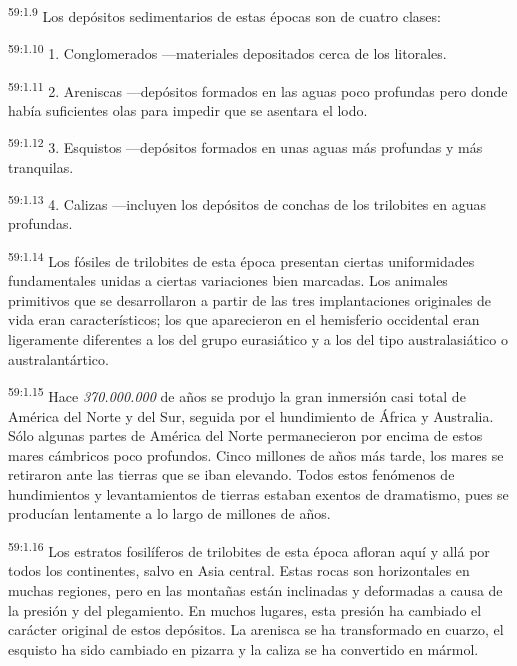 \par
\textsuperscript{59:1.9} Los depósitos sedimentarios de estas épocas son de cuatro clases:

\par
\textsuperscript{59:1.10} 1. Conglomerados ---materiales depositados cerca de los litorales.

\par
\textsuperscript{59:1.11} 2. Areniscas ---depósitos formados en las aguas poco profundas pero donde había suficientes olas para impedir que se asentara el lodo.

\par
\textsuperscript{59:1.12} 3. Esquistos ---depósitos formados en unas aguas más profundas y más tranquilas.

\par
\textsuperscript{59:1.13} 4. Calizas ---incluyen los depósitos de conchas de los trilobites en aguas profundas.

\par
\textsuperscript{59:1.14} Los fósiles de trilobites de esta época presentan ciertas uniformidades fundamentales unidas a ciertas variaciones bien marcadas. Los animales primitivos que se desarrollaron a partir de las tres implantaciones originales de vida eran característicos; los que aparecieron en el hemisferio occidental eran ligeramente diferentes a los del grupo eurasiático y a los del tipo australasiático o australantártico.

\par
\textsuperscript{59:1.15} Hace \textit{370.000.000} de años se produjo la gran inmersión casi total de América del Norte y del Sur, seguida por el hundimiento de África y Australia. Sólo algunas partes de América del Norte permanecieron por encima de estos mares cámbricos poco profundos. Cinco millones de años más tarde, los mares se retiraron ante las tierras que se iban elevando. Todos estos fenómenos de hundimientos y levantamientos de tierras estaban exentos de dramatismo, pues se producían lentamente a lo largo de millones de años.

\par
\textsuperscript{59:1.16} Los estratos fosilíferos de trilobites de esta época afloran aquí y allá por todos los continentes, salvo en Asia central. Estas rocas son horizontales en muchas regiones, pero en las montañas están inclinadas y deformadas a causa de la presión y del plegamiento. En muchos lugares, esta presión ha cambiado el carácter original de estos depósitos. La arenisca se ha transformado en cuarzo, el esquisto ha sido cambiado en pizarra y la caliza se ha convertido en mármol.

